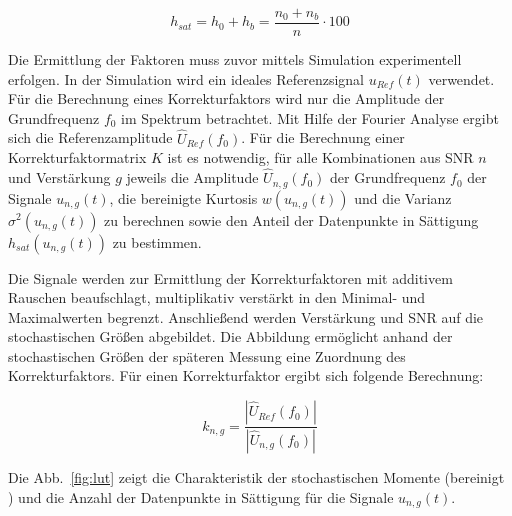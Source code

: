 \begin{equation}
	\label{eq:dist_sat}
	h_{sat} = h_0 + h_b = \frac{n_0 + n_b}{n} \cdot 100
\end{equation}




Die Ermittlung der Faktoren muss zuvor mittels Simulation experimentell erfolgen. In der Simulation wird ein ideales Referenzsignal $u_{Ref}(t)$ verwendet. Für die Berechnung eines Korrekturfaktors wird nur die Amplitude der Grundfrequenz $f_0$ im Spektrum betrachtet. Mit Hilfe der Fourier Analyse ergibt sich die Referenzamplitude $\hat{U}_{Ref}(f_0)$. Für die Berechnung einer Korrekturfaktormatrix $K$ ist es notwendig, für alle Kombinationen aus SNR $n$ und Verstärkung $g$ jeweils die Amplitude $\hat{U}_{n,g}(f_0)$ der Grundfrequenz $f_0$ der Signale $u_{n,g}(t)$, die bereinigte Kurtosis $w(u_{n,g}(t))$ und die Varianz $\sigma^2(u_{n,g}(t))$ zu berechnen sowie den Anteil der Datenpunkte in Sättigung $h_{sat}(u_{n,g}(t))$ zu bestimmen. 

Die Signale werden zur Ermittlung der Korrekturfaktoren mit additivem Rauschen beaufschlagt, multiplikativ verstärkt in den Minimal- und Maximalwerten begrenzt. Anschließend werden Verstärkung und SNR auf die stochastischen Größen abgebildet. Die Abbildung ermöglicht anhand der stochastischen Größen der späteren Messung eine Zuordnung des Korrekturfaktors.
Für einen Korrekturfaktor ergibt sich folgende Berechnung: 

$$
k_{n,g} = \frac{|\hat{U}_{Ref}(f_0)|}{|\hat{U}_{n,g}(f_0)|} %
$$

Die Abb.~\ref{fig:lut} zeigt die Charakteristik der stochastischen Momente (bereinigt ) und die Anzahl der Datenpunkte in Sättigung für die Signale $u_{n,g}(t)$. 

